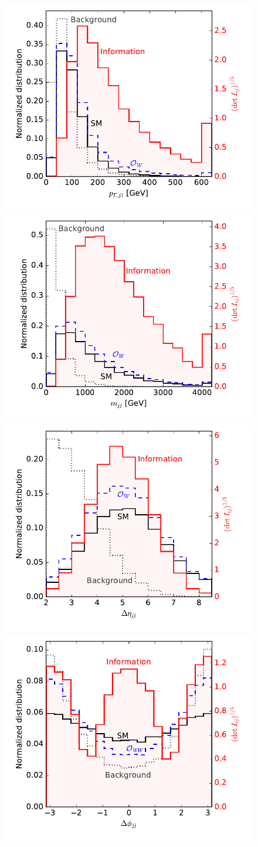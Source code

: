 \begin{figure}
  \includegraphics[width=0.49 \textwidth,clip=true,trim=0.4cm 0.6cm 0.4cm 0.0cm]{fig/information/wbf_tautau_information_over_ptj}%
  \includegraphics[width=0.49 \textwidth,clip=true,trim=0.4cm 0.6cm 0.4cm 0.0cm]{fig/information/wbf_tautau_information_over_mjj}\\%
  \includegraphics[width=0.49 \textwidth,clip=true,trim=0.4cm 0.6cm 0.4cm 0.0cm]{fig/information/wbf_tautau_information_over_deltaeta}%
  \includegraphics[width=0.49 \textwidth,clip=true,trim=0.4cm 0.6cm 0.4cm 0.0cm]{fig/information/wbf_tautau_information_over_deltaphi}%

\end{figure}
